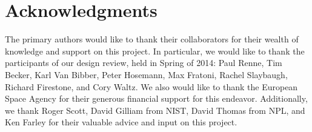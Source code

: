 \documentclass{mc2015}
\begin{document}
\section{Acknowledgments}

The primary authors would like to thank their collaborators for their wealth of knowledge and support on this project. In particular, we would like to thank the participants of our design review, held in Spring of 2014: Paul Renne, Tim Becker, Karl Van Bibber, Peter Hosemann, Max Fratoni, Rachel Slaybaugh, Richard Firestone, and Cory Waltz. We also would like to thank the European Space Agency for their generous financial support for this endeavor. Additionally, we thank Roger Scott, David Gilliam from NIST, David Thomas from NPL, and Ken Farley for their valuable advice and input on this project. 

\setlength{\baselineskip}{12pt}




\end{document}
